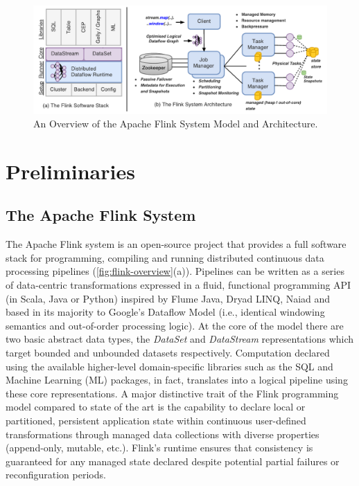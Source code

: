 \begin{figure}[t!]
\centering
\includegraphics[width=\textwidth]{figures/flinkoverview.pdf}
\caption{An Overview of the Apache Flink System Model and Architecture.} 
\label{fig:flink-overview}
\vspace{-4mm}
\end{figure}

\section{Preliminaries}
\label{sec:preliminaries}
\subsection{The Apache Flink System}

The Apache Flink system \cite{CUSTOM:web/Flink} is an open-source project that provides a full software stack for programming, compiling and running distributed continuous data processing pipelines (\autoref{fig:flink-overview}(a)). Pipelines can be written as a series of data-centric transformations expressed in a fluid, functional programming API (in Scala, Java or Python) inspired by Flume Java\cite{chambers2010flumejava}, Dryad LINQ\cite{yu2008dryadlinq}, Naiad\cite{murray2013naiad} and based in its majority to Google's Dataflow Model \cite{akidau2015dataflow} (i.e., identical windowing semantics and out-of-order processing logic). At the core of the model there are two basic abstract data types, the \emph{DataSet} and \emph{DataStream} representations which target bounded and unbounded datasets respectively. Computation declared using the available higher-level domain-specific libraries such as the SQL and Machine Learning (ML) packages, in fact, translates into a logical pipeline using these core representations. A major distinctive trait of the Flink programming model compared to state of the art is the capability to declare local or partitioned, persistent application state within continuous user-defined transformations through managed data collections with diverse properties (append-only, mutable, etc.). Flink's runtime ensures that consistency is guaranteed for any managed state declared despite potential partial failures or reconfiguration periods.

